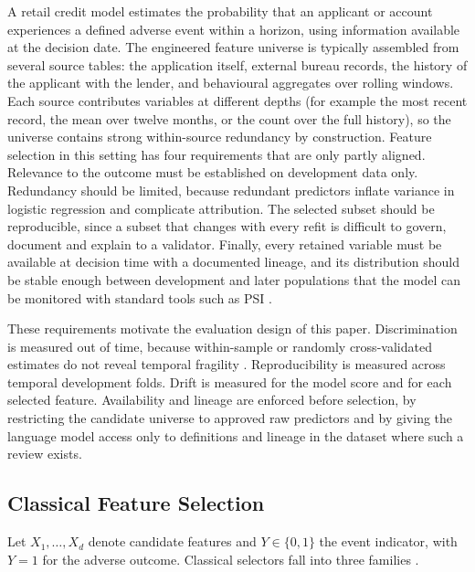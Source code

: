 \documentclass[preprint,12pt]{elsarticle}
\begin{document}
A retail credit model estimates the probability that an applicant or account experiences a defined adverse event within a horizon, using information available at the decision date. The engineered feature universe is typically assembled from several source tables: the application itself, external bureau records, the history of the applicant with the lender, and behavioural aggregates over rolling windows. Each source contributes variables at different depths (for example the most recent record, the mean over twelve months, or the count over the full history), so the universe contains strong within-source redundancy by construction. Feature selection in this setting has four requirements that are only partly aligned. Relevance to the outcome must be established on development data only. Redundancy should be limited, because redundant predictors inflate variance in logistic regression and complicate attribution. The selected subset should be reproducible, since a subset that changes with every refit is difficult to govern, document and explain to a validator. Finally, every retained variable must be available at decision time with a documented lineage, and its distribution should be stable enough between development and later populations that the model can be monitored with standard tools such as PSI \cite{siddiqi2006,thomas2002,yurdakul2020}.

These requirements motivate the evaluation design of this paper. Discrimination is measured out of time, because within-sample or randomly cross-validated estimates do not reveal temporal fragility \cite{bergmeir2012}. Reproducibility is measured across temporal development folds. Drift is measured for the model score and for each selected feature. Availability and lineage are enforced before selection, by restricting the candidate universe to approved raw predictors and by giving the language model access only to definitions and lineage in the dataset where such a review exists.

\subsection{Classical Feature Selection}
\label{subsec:classical_fs_background}

Let $X_1,\dots,X_d$ denote candidate features and $Y\in\{0,1\}$ the event indicator, with $Y=1$ for the adverse outcome. Classical selectors fall into three families \cite{kohavi1997,guyon2003}.
\end{document}
